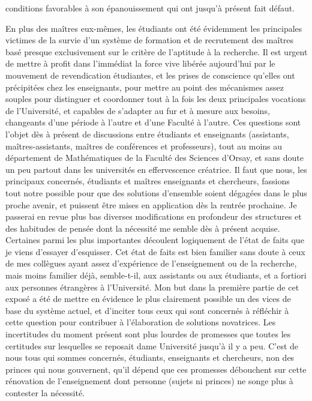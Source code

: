 \documentclass[11pt,a4paper]{article}
\begin{document}
conditions favorables à son épanouissement qui ont jusqu'à présent fait défaut.

En plus des maîtres eux-mêmes, les étudiants ont été évidemment les principales victimes de la survie d'un système de formation et de recrutement des maîtres basé presque exclusivement sur le critère de l'aptitude à la recherche. Il est urgent de mettre à profit dans l'immédiat la force vive libérée aujourd'hui par le mouvement de revendication étudiantes, et les prises de conscience qu'elles ont précipitées chez les enseignants, pour mettre au point des mécanismes assez souples pour distinguer et coordonner tout à la fois les deux principales vocations de l'Université, et capables de s'adapter au fur et à mesure aux besoins, changeants d'une période à l'autre et d'une Faculté à l'autre. Ces questions sont l'objet dès à présent de discussions entre étudiants et enseignants (assistants, maîtres-assistants, maîtres de conférences et professeurs), tout au moins au département de Mathématiques de la Faculté des Sciences d'Orsay, et sans doute un peu partout dans les universités en effervescence créatrice. Il faut que nous, les principaux concernés, étudiants et maîtres enseignants et chercheurs, fassions tout notre possible pour que des solutions d'ensemble soient dégagées dans le plus proche avenir, et puissent être mises en application dès la rentrée prochaine. Je passerai en revue plus bas diverses modifications en profondeur des structures et des habitudes de pensée dont la nécessité me semble dès à présent acquise. Certaines parmi les plus importantes découlent logiquement de l'état de faits que je viens d'essayer d'esquisser. Cet état de faits est bien familier sans doute à ceux de mes collègues ayant assez d'expérience de l'enseignement ou de la recherche, mais moins familier déjà, semble-t-il, aux assistants ou aux étudiants, et a fortiori aux personnes étrangères à l'Université. Mon but dans la première partie de cet exposé a été de mettre en évidence le plus clairement possible un des vices de base du système actuel, et d'inciter tous ceux qui sont concernés à réfléchir à cette question pour contribuer à l'élaboration de solutions novatrices. Les incertitudes du moment présent sont plus lourdes de promesses que toutes les certitudes sur lesquelles se reposait dame Université jusqu'à il y a peu. C'est de nous tous qui sommes concernés, étudiants, enseignants et chercheurs, non des princes qui nous gouvernent, qu'il dépend que ces promesses débouchent sur cette rénovation de l'enseignement dont personne (sujets ni princes) ne songe plus à contester la nécessité.
\end{document}

